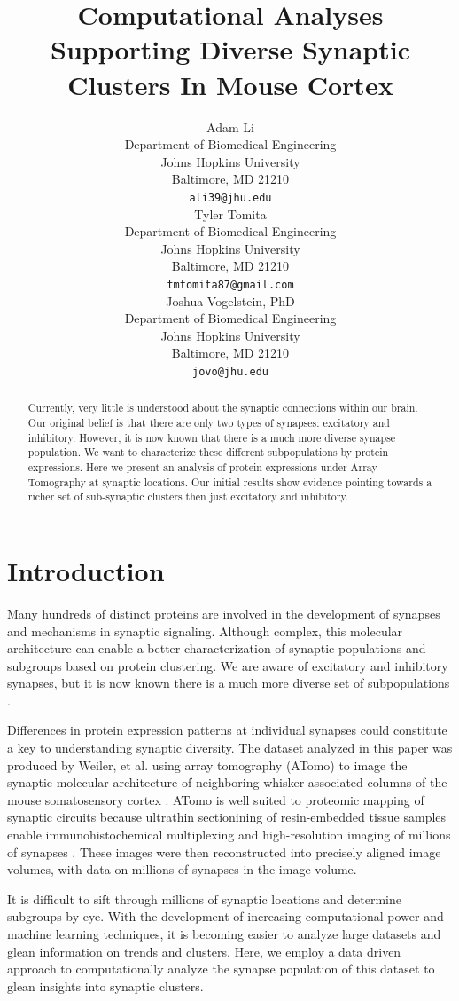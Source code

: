 \documentclass{article}
\title{Computational Analyses Supporting Diverse Synaptic Clusters In Mouse Cortex}
\author{
  Adam Li \\
  Department of Biomedical Engineering\\
  Johns Hopkins University\\
  Baltimore, MD 21210 \\
  \texttt{ali39@jhu.edu} \\
  \And
  Tyler Tomita \\
  Department of Biomedical Engineering\\
  Johns Hopkins University\\
  Baltimore, MD 21210 \\
  \texttt{tmtomita87@gmail.com} \\
  \And
  Joshua Vogelstein, PhD \\
  Department of Biomedical Engineering\\
  Johns Hopkins University\\
  Baltimore, MD 21210 \\
  \texttt{jovo@jhu.edu} \\
}
\begin{document}
\maketitle

\begin{abstract}
  Currently, very little is understood about the synaptic connections within our brain. Our original belief is that there are only two types of synapses: excitatory and inhibitory. However, it is now known that there is a much more diverse synapse population. We want to characterize these different subpopulations by protein expressions. Here we present an analysis of protein expressions under Array Tomography at synaptic locations. Our initial results show evidence pointing towards a richer set of sub-synaptic clusters then just excitatory and inhibitory. 
\end{abstract}

\section{Introduction}

Many hundreds of distinct proteins are involved in the development of synapses and mechanisms in synaptic signaling. Although complex, this molecular architecture can enable a better characterization of synaptic populations and subgroups based on protein clustering. We are aware of excitatory and inhibitory synapses, but it is now known there is a much more diverse set of subpopulations \cite{Wheeler2015,Usoskin2014a}.

Differences in protein expression patterns at individual synapses could constitute a key to understanding synaptic diversity. The dataset analyzed in this paper was produced by Weiler, et al. using array tomography (ATomo) to image the synaptic molecular architecture of neighboring whisker-associated columns of the mouse somatosensory cortex \cite{Weiler2014}. ATomo is well suited to proteomic mapping of synaptic circuits because ultrathin sectionining of resin-embedded tissue samples enable immunohistochemical multiplexing and high-resolution imaging of millions of synapses \cite{Micheva2007}. These images were then reconstructed into precisely aligned image volumes, with data on millions of synapses in the image volume.

It is difficult to sift through millions of synaptic locations and determine subgroups by eye. With the development of increasing computational power and machine learning techniques, it is becoming easier to analyze large datasets and glean information on trends and clusters. Here, we employ a data driven approach to computationally analyze the synapse population of this dataset to glean insights into synaptic clusters. 
\end{document}
